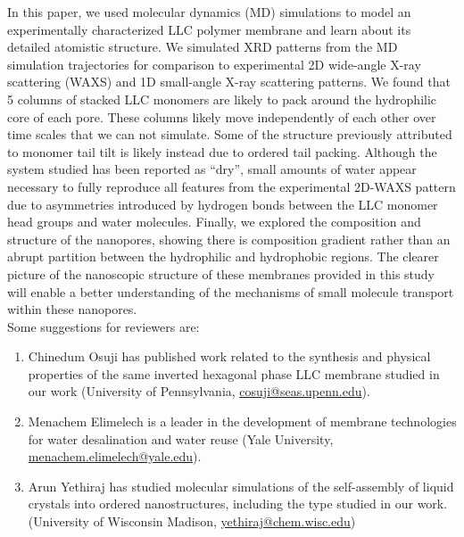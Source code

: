 \documentclass[fontsize=11pt]{article}
\begin{document}
	In this paper, we used molecular dynamics (MD) simulations to model an
	experimentally characterized LLC polymer membrane and learn about its detailed atomistic
	structure. We simulated XRD patterns from the MD simulation trajectories
	for comparison to experimental 2D wide-angle X-ray scattering (WAXS) and 1D 
	small-angle X-ray scattering patterns. We found that 5 columns of stacked LLC monomers are 
	likely to pack around the hydrophilic core of each pore. These 
	columns likely move independently of each other	over time scales that we can not
	simulate. Some of the structure previously attributed to monomer
	tail tilt is likely instead due to ordered tail packing. Although the system studied
	has been reported as ``dry'', small amounts of water appear necessary to 
	fully reproduce all features from the experimental 2D-WAXS pattern due to asymmetries
	introduced by hydrogen bonds between the LLC monomer head groups and water molecules.
	Finally, we explored the composition and structure of the nanopores, showing there is 
        composition gradient rather than an abrupt partition between the 
	hydrophilic and hydrophobic regions. The clearer picture of the nanoscopic structure
	of these membranes provided in this study will enable a better understanding of the
	mechanisms of small molecule transport within these nanopores. \\
	
	\noindent Some suggestions for reviewers are:
	\begin{enumerate}
		\item Chinedum Osuji has published work related to the synthesis and physical
		properties of the same inverted hexagonal phase LLC membrane studied in our 
		work (University of Pennsylvania, 
		\href{mailto:cosuji@seas.upenn.edu}{cosuji@seas.upenn.edu}).
		\item Menachem Elimelech is a leader in the development of membrane technologies
		for	water desalination and water reuse (Yale University, 
		\href{mailto:menachem.elimelech@yale.edu}{menachem.elimelech@yale.edu}).
		\item Arun Yethiraj has studied molecular simulations of the self-assembly
		of liquid crystals into ordered nanostructures, including the type studied
		in our work. (University of Wisconsin Madison, 
		\href{mailto:yethiraj@chem.wisc.edu}{yethiraj@chem.wisc.edu})  %
	\end{enumerate}
	
\end{document}

